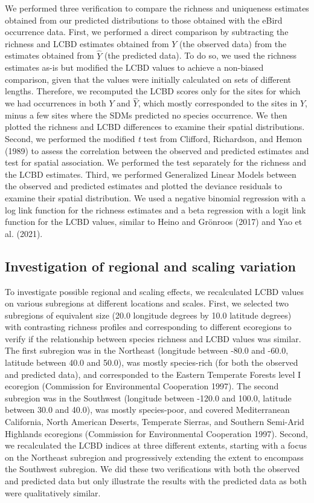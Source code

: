 \documentclass[10pt,oneside]{article}
\begin{document}
We performed three verification to compare the richness and uniqueness
estimates obtained from our predicted distributions to those obtained
with the eBird occurrence data. First, we performed a direct comparison
by subtracting the richness and LCBD estimates obtained from \(Y\) (the
observed data) from the estimates obtained from \(\hat{Y}\) (the
predicted data). To do so, we used the richness estimates as-is but
modified the LCBD values to achieve a non-biased comparison, given that
the values were initially calculated on sets of different lengths.
Therefore, we recomputed the LCBD scores only for the sites for which we
had occurrences in both \(Y\) and \(\hat{Y}\), which mostly corresponded
to the sites in \(Y\), minus a few sites where the SDMs predicted no
species occurrence. We then plotted the richness and LCBD differences to
examine their spatial distributions. Second, we performed the modified
\emph{t} test from Clifford, Richardson, and Hemon (1989) to assess the
correlation between the observed and predicted estimates and test for
spatial association. We performed the test separately for the richness
and the LCBD estimates. Third, we performed Generalized Linear Models
between the observed and predicted estimates and plotted the deviance
residuals to examine their spatial distribution. We used a negative
binomial regression with a log link function for the richness estimates
and a beta regression with a logit link function for the LCBD values,
similar to Heino and Grönroos (2017) and Yao et al. (2021).

\hypertarget{investigation-of-regional-and-scaling-variation}{%
\subsection{Investigation of regional and scaling
variation}\label{investigation-of-regional-and-scaling-variation}}

To investigate possible regional and scaling effects, we recalculated
LCBD values on various subregions at different locations and scales.
First, we selected two subregions of equivalent size (20.0 longitude
degrees by 10.0 latitude degrees) with contrasting richness profiles and
corresponding to different ecoregions to verify if the relationship
between species richness and LCBD values was similar. The first
subregion was in the Northeast (longitude between -80.0 and -60.0,
latitude between 40.0 and 50.0), was mostly species-rich (for both the
observed and predicted data), and corresponded to the Eastern Temperate
Forests level I ecoregion (Commission for Environmental Cooperation
1997). The second subregion was in the Southwest (longitude between
-120.0 and 100.0, latitude between 30.0 and 40.0), was mostly
species-poor, and covered Mediterranean California, North American
Deserts, Temperate Sierras, and Southern Semi-Arid Highlands ecoregions
(Commission for Environmental Cooperation 1997). Second, we recalculated
the LCBD indices at three different extents, starting with a focus on
the Northeast subregion and progressively extending the extent to
encompass the Southwest subregion. We did these two verifications with
both the observed and predicted data but only illustrate the results
with the predicted data as both were qualitatively similar.
\end{document}
